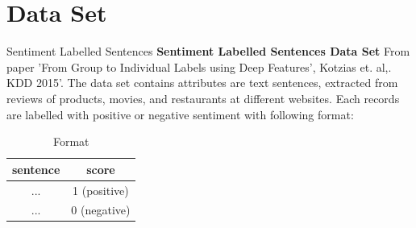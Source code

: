 \documentclass{beamer}
\begin{document}





\section{Data Set}
\begin{frame}{Sentiment Labelled Sentences}
\textbf{Sentiment Labelled Sentences Data Set}
From paper 'From Group to Individual Labels using Deep Features', Kotzias et. al,. KDD 2015'.
The data set contains attributes are text sentences, extracted from reviews of products, movies, and restaurants at different websites. Each records are labelled with positive or negative sentiment with following format:
\begin{table}[]
    \centering
    \begin{tabular}{c|c}
    \hline
         sentence&score  \\
         \hline
         ...& 1 (positive) \\
         ...& 0 (negative) \\
         \hline
    \end{tabular}
    \caption{Format}
    \label{tab:format}
\end{table}
\end{frame}
\end{document}

